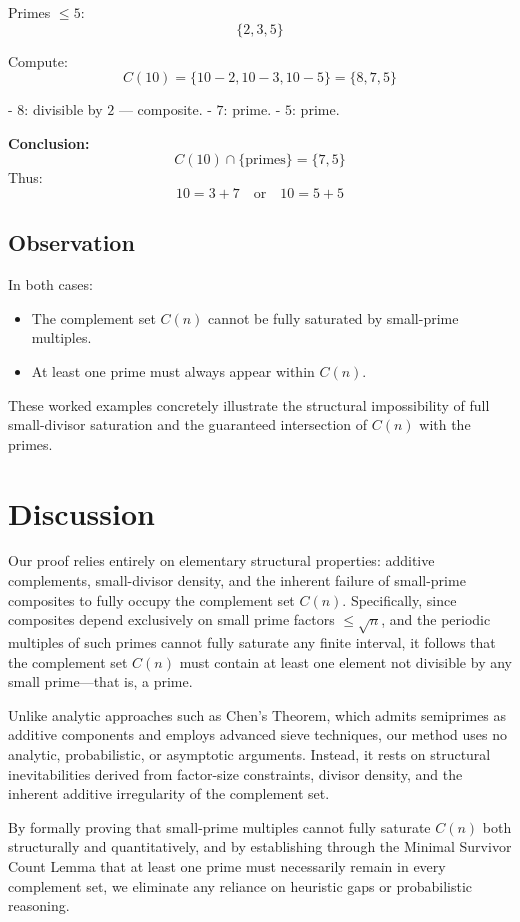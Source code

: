 \documentclass[11pt]{article}
\begin{document}
	Primes \( \leq 5 \):
	\[
	\{2, 3, 5\}
	\]
	
	Compute:
	\[
	C(10) = \{10 - 2, 10 - 3, 10 - 5\} = \{8, 7, 5\}
	\]
	
	- \( 8 \): divisible by \( 2 \) — composite.
	- \( 7 \): prime.
	- \( 5 \): prime.
	
	\textbf{Conclusion:}
	\[
	C(10) \cap \{\text{primes}\} = \{7, 5\}
	\]
	Thus:
	\[
	10 = 3 + 7 \quad \text{or} \quad 10 = 5 + 5
	\]
	
	\subsection*{Observation}
	
	In both cases:
	\begin{itemize}
		\item The complement set \( C(n) \) cannot be fully saturated by small-prime multiples.
		\item At least one prime must always appear within \( C(n) \).
	\end{itemize}
	
	These worked examples concretely illustrate the structural impossibility of full small-divisor saturation and the guaranteed intersection of \( C(n) \) with the primes.



	\section{Discussion}
	
	Our proof relies entirely on elementary structural properties: additive complements, small-divisor density, and the inherent failure of small-prime composites to fully occupy the complement set \( C(n) \). Specifically, since composites depend exclusively on small prime factors \( \leq \sqrt{n} \), and the periodic multiples of such primes cannot fully saturate any finite interval, it follows that the complement set \( C(n) \) must contain at least one element not divisible by any small prime—that is, a prime.
	
	Unlike analytic approaches such as Chen's Theorem, which admits semiprimes as additive components and employs advanced sieve techniques, our method uses no analytic, probabilistic, or asymptotic arguments. Instead, it rests on structural inevitabilities derived from factor-size constraints, divisor density, and the inherent additive irregularity of the complement set.
	
	By formally proving that small-prime multiples cannot fully saturate \( C(n) \) both structurally and quantitatively, and by establishing through the Minimal Survivor Count Lemma that at least one prime must necessarily remain in every complement set, we eliminate any reliance on heuristic gaps or probabilistic reasoning.
	
\end{document}
